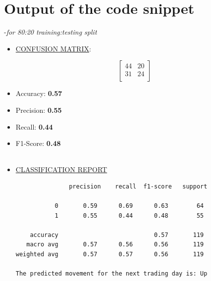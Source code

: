 \documentclass[12pt,a4paper]{report}
\begin{document}
\section{Output of the code snippet}-\textit{for 80:20 training:testing split}
\begin{itemize}
\item \underline{CONFUSION MATRIX}:
    \vspace{-0.5cm}
    \begin{flushleft}
    \[
    \begin{bmatrix}
        44 & 20 \\
        31 & 24 \\
    \end{bmatrix}
    \]
    \end{flushleft}
    \vspace{-0.5cm} %

    \item Accuracy: \textbf{0.57}
    \item Precision: \textbf{0.55}
    \item Recall: \textbf{0.44}
    \item F1-Score: \textbf{0.48}
\\
\\
    \item \underline{CLASSIFICATION REPORT}
\begin{verbatim}
               precision    recall  f1-score   support

           0       0.59      0.69      0.63        64
           1       0.55      0.44      0.48        55

    accuracy                           0.57       119
   macro avg       0.57      0.56      0.56       119
weighted avg       0.57      0.57      0.56       119

The predicted movement for the next trading day is: Up
\end{verbatim}
\end{itemize}












\end{document}
